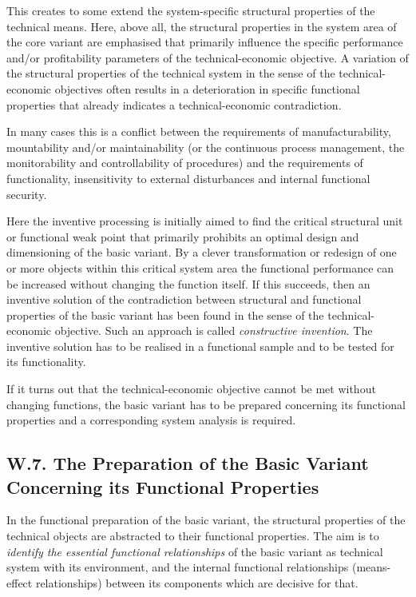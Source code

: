 \documentclass[11pt,a4paper]{article}
\begin{document}
This creates to some extend the system-specific structural properties of the
technical means.  Here, above all, the structural properties in the system
area of the core variant are emphasised that primarily influence the specific
performance and/or profitability parameters of the technical-economic
objective.  A variation of the structural properties of the technical system
in the sense of the technical-economic objectives often results in a
deterioration in specific functional properties that already indicates a
technical-economic contradiction.

In many cases this is a conflict between the requirements of
manufacturability, mountability and/or maintainability (or the continuous
process management, the monitorability and controllability of procedures) and
the requirements of functionality, insensitivity to external disturbances and
internal functional security.

Here the inventive processing is initially aimed to find the critical
structural unit or functional weak point that primarily prohibits an optimal
design and dimensioning of the basic variant. By a clever transformation or
redesign of one or more objects within this critical system area the
functional performance can be increased without changing the function itself.
If this succeeds, then an inventive solution of the contradiction between
structural and functional properties of the basic variant has been found in
the sense of the technical-economic objective.  Such an approach is called
\emph{constructive invention}. The inventive solution has to be realised in a
functional sample and to be tested for its functionality.

If it turns out that the technical-economic objective cannot be met without
changing functions, the basic variant has to be prepared concerning its
functional properties and a corresponding system analysis is required.

\subsection*{W.7. The Preparation of the Basic Variant Concerning its
  Functional Properties}

In the functional preparation of the basic variant, the structural properties
of the technical objects are abstracted to their functional properties. The
aim is to \emph{identify the essential functional relationships} of the basic
variant as technical system with its environment, and the internal functional
relationships (means-effect relationships) between its components which are
decisive for that.
\end{document}
